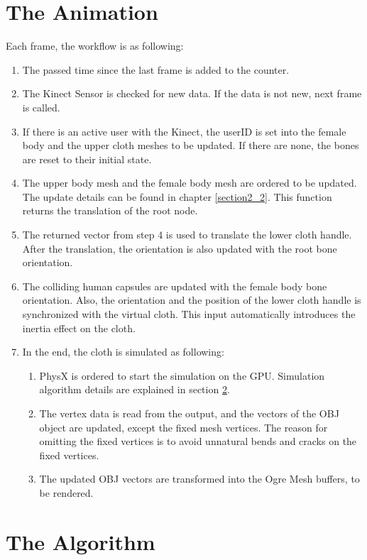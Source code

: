 \section{The Animation}
Each frame, the workflow is as following:
\begin{enumerate}
\item The passed time since the last frame is added to the counter.
\item The Kinect Sensor is checked for new data. If the data is not new, next frame is called. 
\item If there is an active user with the Kinect, the userID is set into the female body and the upper cloth meshes to be updated. If there are none, the bones are reset to their initial state.
\item The upper body mesh and the female body mesh are ordered to be updated. The update details can be found in chapter \ref{section2_2}. This function returns the translation of the root node. 
\item The returned vector from step 4 is used to translate the lower cloth handle. After the translation, the orientation is also updated with the root bone orientation.
\item The colliding human capsules are updated with the female body bone orientation. Also, the orientation and the position of the lower cloth handle is synchronized with the virtual cloth. This input automatically introduces the inertia effect on the cloth.
\item In the end, the cloth is simulated as following:
\begin{enumerate}
  \item PhysX is ordered to start the simulation on the GPU. Simulation algorithm details are explained in section \ref{section3_4}.
  \item The vertex data is read from the output, and the vectors of the OBJ object are updated, except the fixed mesh vertices. The reason for omitting the fixed vertices is to avoid unnatural bends and cracks on the fixed vertices.
  \item The updated OBJ vectors are transformed into the Ogre Mesh buffers, to be rendered. 
\end{enumerate}
\end{enumerate}

\section{The Algorithm}
\label{section3_4}

